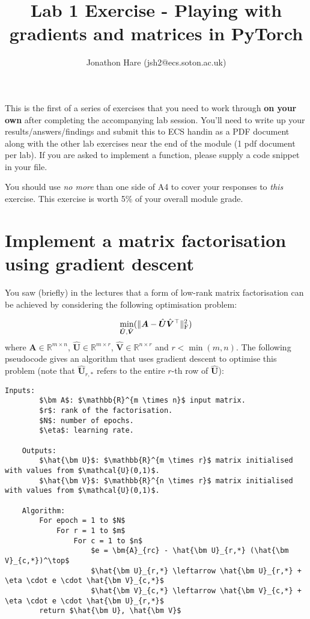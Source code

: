 \documentclass[a4paper]{article}
\begin{document}
\setlength{\leftskip}{20pt}
\title{Lab 1 Exercise - Playing with gradients and matrices in PyTorch}
\author{Jonathon Hare (jsh2@ecs.soton.ac.uk)}

\maketitle


This is the first of a series of exercises that you need to work through \textbf{on your own} after completing the accompanying lab session. You'll need to write up your results/answers/findings and submit this to ECS handin as a PDF document along with the other lab exercises near the end of the module (1 pdf document per lab). If you are asked to implement a function, please supply a code snippet in your file.

You should use \emph{no more} than one side of A4 to cover your responses to \emph{this} exercise. This exercise is worth 5\% of your overall module grade.

\section{Implement a matrix factorisation using gradient descent}\label{sgd}

You saw (briefly) in the lectures that a form of low-rank matrix factorisation can be achieved by considering the following optimisation problem:

\begin{equation}
	\min\limits_{\hat{\bm U}, \hat{\bm V}}( \| \bm A - \hat{\bm U}\hat{\bm V}^\top \|_{\rm F}^2 )
\end{equation}
where $\bm A \in \mathbb{R}^{m \times n}$, $\hat{\bm U} \in \mathbb{R}^{m \times r}$, $\hat{\bm V} \in \mathbb{R}^{n \times r}$ and $r<\min(m,n)$. The following pseudocode gives an algorithm that uses gradient descent to optimise this problem  (note that $\hat{\bm U}_{r,*}$ refers to the entire $r$-th row of $\hat{\bm U}$):

\begin{lstlisting}[mathescape=true,tabsize=4]
	Inputs: 
		$\bm A$: $\mathbb{R}^{m \times n}$ input matrix.
		$r$: rank of the factorisation.
		$N$: number of epochs.
		$\eta$: learning rate.

	Outputs:
		$\hat{\bm U}$: $\mathbb{R}^{m \times r}$ matrix initialised with values from $\mathcal{U}(0,1)$.
		$\hat{\bm V}$: $\mathbb{R}^{n \times r}$ matrix initialised with values from $\mathcal{U}(0,1)$.

	Algorithm:
		For epoch = 1 to $N$
			For r = 1 to $m$
				For c = 1 to $n$
					$e = \bm{A}_{rc} - \hat{\bm U}_{r,*} (\hat{\bm V}_{c,*})^\top$
					$\hat{\bm U}_{r,*} \leftarrow \hat{\bm U}_{r,*} + \eta \cdot e \cdot \hat{\bm V}_{c,*}$
					$\hat{\bm V}_{c,*} \leftarrow \hat{\bm V}_{c,*} + \eta \cdot e \cdot \hat{\bm U}_{r,*}$
		return $\hat{\bm U}, \hat{\bm V}$
\end{lstlisting}
\end{document}
